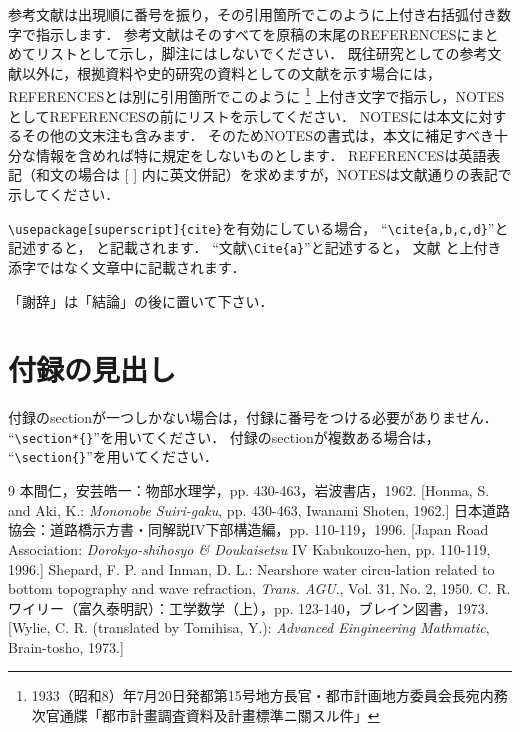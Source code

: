 \documentclass{jjsce}
\begin{document}
参考文献は出現順に番号を振り，その引用箇所でこのように\cite{a}上付き右括弧付き数字で指示します．
参考文献はそのすべてを原稿の末尾のREFERENCESにまとめてリストとして示し，脚注にはしないでください．
既往研究としての参考文献以外に，根拠資料や史的研究の資料としての文献を示す場合には，REFERENCESとは別に引用箇所でこのように
\footnote{1933（昭和8）年7月20日発都第15号地方長官・都市計画地方委員会長宛内務次官通牒「都市計畫調査資料及計畫標準ニ關スル件」}
上付き文字で指示し，NOTESとしてREFERENCESの前にリストを示してください．
NOTESには本文に対するその他の文末注も含みます．
そのためNOTESの書式は，本文に補足すべき十分な情報を含めれば特に規定をしないものとします．
REFERENCESは英語表記（和文の場合は [ ] 内に英文併記）を求めますが，NOTESは文献通りの表記で示してください．

\verb|\usepackage[superscript]{cite}|を有効にしている場合，
``\verb|\cite{a,b,c,d}|''と記述すると，
\cite{a,b,c,d} と記載されます．
``文献\verb|\Cite{a}|''と記述すると，
文献\Cite{a} と上付き添字ではなく文章中に記載されます．

\Acknowledgment %
「謝辞」は「結論」の後に置いて下さい．

\appendix
\section*{付録の見出し}
付録のsectionが一つしかない場合は，付録に番号をつける必要がありません．
``\verb|\section*{}|''を用いてください．
付録のsectionが複数ある場合は，
``\verb|\section{}|''を用いてください．

\begin{thebibliography}{9}
本間仁，安芸皓一：物部水理学，pp. 430-463，岩波書店，1962. [Honma, S. and Aki, K.: \textit{Mononobe Suiri-gaku}, pp. 430-463, Iwanami Shoten, 1962.]
日本道路協会：道路橋示方書・同解説IV下部構造編，pp. 110-119，1996. [Japan Road Association: \textit{Dorokyo-shihosyo \& Doukaisetsu} IV Kabukouzo-hen, pp. 110-119, 1996.]
Shepard, F. P. and Inman, D. L.: Nearshore water circu-lation related to bottom topography and wave refraction, \textit{Trans. AGU}., Vol. 31, No. 2, 1950.
C. R. ワイリー（富久泰明訳）：工学数学（上），pp. 123-140，ブレイン図書，1973. [Wylie, C. R. (translated by Tomihisa, Y.): \textit{Advanced Eingineering Mathmatic}, Brain-tosho, 1973.]
\end{thebibliography}
\end{document}
